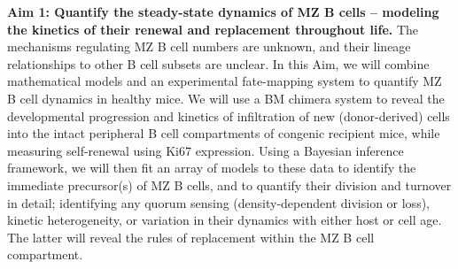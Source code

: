 \documentclass[11pt]{article} %
\begin{document}
\textbf{Aim 1: Quantify the steady-state dynamics of MZ B cells -- modeling the kinetics of their renewal and replacement throughout life.} 
The mechanisms regulating MZ B cell numbers are unknown, and their lineage relationships to other B cell subsets are unclear. In this Aim, we will combine mathematical models and an experimental fate-mapping system to quantify MZ B cell dynamics in healthy mice.
We will use a BM chimera system to reveal the developmental progression and kinetics of infiltration of new (donor-derived) cells into the intact peripheral B cell compartments of congenic recipient mice, while measuring self-renewal using Ki67 expression. Using a  Bayesian inference framework, we will then fit  an array of  models to these data to identify the immediate precursor(s) of MZ B cells, and to quantify their division and turnover in detail; identifying any quorum sensing (density-dependent division or loss), kinetic heterogeneity,  or variation in their dynamics with either host or cell age. The latter will reveal the rules of replacement within the MZ B cell compartment.
%
%
%
%
%
% 
\end{document}
